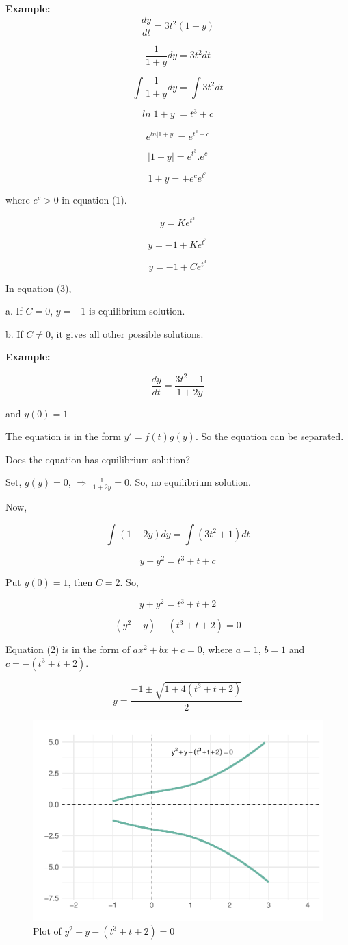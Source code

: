 \documentclass[
  11pt,
]{article}
\begin{document}
\textbf{Example:} \[\frac{dy}{dt} = 3t^2(1+y)\]

\[
\frac{1}{1+y}dy = 3t^2dt \tag{1}
\]

\[
\int\frac{1}{1+y}dy = \int3t^2dt
\]

\[
ln|{1+y}|=t^3 + c
\]

\[
e^{ln|1+y|}=e^{t^3+c}
\]

\[
|1+y|=e^{t^3}.e^c 
\]

\[
1+y = \pm e^ce^{t^3} \tag{2}
\]

where \(e^c>0\) in equation (1).

\[
y = Ke^{t^3}
\]

\[
y = -1 + Ke^{t^3}
\]

\[
y = -1 + Ce^{t^3} \tag{3}
\]

In equation (3),

a. If \(C = 0\), \(y=-1\) is equilibrium solution.

b. If \(C \neq 0\), it gives all other possible solutions.

\textbf{Example:}

\[
\frac{dy}{dt}=\frac{3t^2+1}{1+2y}
\]

and \(y(0) = 1\)

The equation is in the form \(y'=f(t)g(y)\). So the equation can be
separated.

Does the equation has equilibrium solution?

Set, \(g(y) = 0\), \(\Longrightarrow\) \(\frac{1}{1+2y} = 0\). So, no
equilibrium solution.

Now,

\[
\int(1+2y)dy=\int(3t^2+1)dt
\]

\[
y+y^2=t^3+t+c \tag{1}
\]

Put \(y(0) = 1\), then \(C = 2\). So,

\[
y+y^2=t^3+t+2
\]

\[
(y^2+y)-(t^3+t+2)=0 \tag{2}
\]

Equation (2) is in the form of \(ax^2+bx+c = 0\), where \(a = 1\),
\(b = 1\) and \(c = -(t^3+t+2)\).

\[
y = \frac{-1\pm\sqrt{1+4(t^3+t+2)}}{2}
\]

\begin{figure}
\centering
\includegraphics{differential_files/figure-latex/difference4-1.pdf}
\caption{Plot of \(y^2+y-(t^3+t+2)=0\)}
\end{figure}
\end{document}
